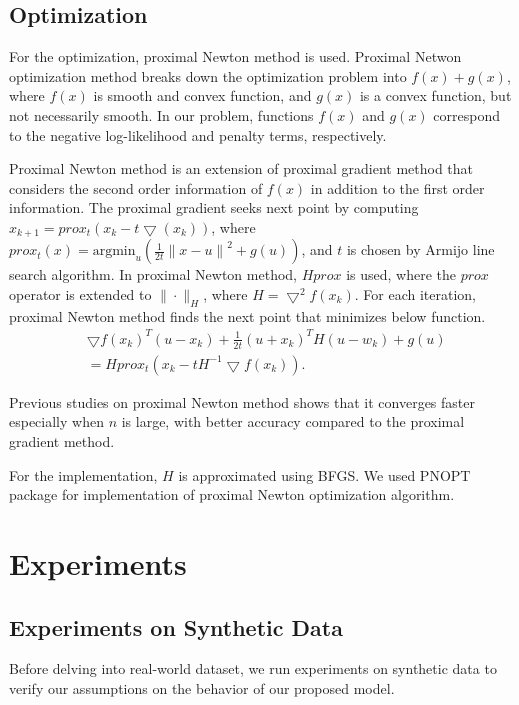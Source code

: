 \documentclass{article}
\begin{document}
\subsection{Optimization}
For the optimization, proximal Newton method \cite{schmidt2010graphical,schmidt2011projected} is used. Proximal Netwon optimization method breaks down the optimization problem into $f(x) + g(x)$, where $f(x)$ is smooth and convex function, and $g(x)$ is a convex function, but not necessarily smooth. 
In our problem, functions $f(x)$ and $g(x)$ correspond to the negative log-likelihood and penalty terms, respectively.

Proximal Newton method is an extension of proximal gradient method that considers the second order information of $f(x)$ in addition to the first order information.
The proximal gradient seeks next point by computing $x_{k+1} = prox_t (x_k - t \bigtriangledown(x_k))$, where $prox_t(x)=\text{argmin}_u(\frac{1}{2t}{\|x-u\|}^2 + g(u))$, and $t$ is chosen by Armijo line search algorithm. In proximal Newton method, $Hprox$ is used, where the $prox$ operator is extended to $\| \cdot \|_H$, where $H=\bigtriangledown^2 f(x_k)$. For each iteration, proximal Newton method finds the next point that minimizes below function.
\begin{align}
  &\bigtriangledown f(x_k)^T(u-x_k)+\frac{1}{2t}(u+x_k)^TH(u-w_k)+g(u) \nonumber    \\
 & =  Hprox_t(x_k-tH^{-1}\bigtriangledown f(x_k)).
\end{align}

Previous studies on proximal Newton method \cite{lee2012proximal} shows that it converges faster especially when $n$ is large, with better accuracy compared to the proximal gradient method.

For the implementation, $H$ is approximated using BFGS.
We used PNOPT package \cite{lee2012proximal} for implementation of proximal Newton optimization algorithm.



\section{Experiments}
\label{Experiments}

\subsection{Experiments on Synthetic Data}
Before delving into real-world dataset, we run experiments on synthetic data to verify our assumptions on the behavior of our proposed model.
\end{document}
